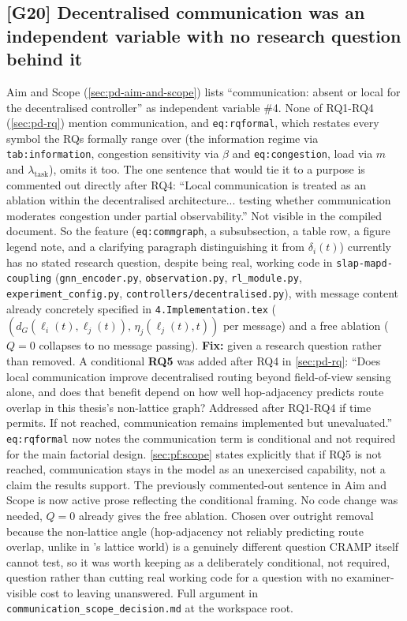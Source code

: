 \documentclass[11pt]{article}
\begin{document}
\subsection{[G20] Decentralised communication was an independent
variable with no research question behind it}
Aim and Scope (\ref{sec:pd-aim-and-scope}) lists ``communication: absent or
local for the decentralised controller'' as independent variable \#4. None
of RQ1-RQ4 (\ref{sec:pd-rq}) mention communication, and \texttt{eq:rqformal},
which restates every symbol the RQs formally range over (the information
regime via \texttt{tab:information}, congestion sensitivity via $\beta$ and
\texttt{eq:congestion}, load via $m$ and $\lambda_{\mathrm{task}}$), omits
it too. The one sentence that would tie it to a purpose is commented out
directly after RQ4: ``Local communication is treated as an ablation within
the decentralised architecture... testing whether communication moderates
congestion under partial observability.'' Not visible in the compiled
document. So the feature (\texttt{eq:commgraph}, a subsubsection, a table
row, a figure legend note, and a clarifying paragraph distinguishing it
from $\delta_i(t)$) currently has no stated research question, despite
being real, working code in \texttt{slap-mapd-coupling}
(\texttt{gnn\_encoder.py}, \texttt{observation.py}, \texttt{rl\_module.py},
\texttt{experiment\_config.py}, \texttt{controllers/decentralised.py}), with
message content already concretely specified in
\texttt{4.Implementation.tex} ($(d_G(\ell_i(t),\ell_j(t)),\,
\eta_j(\ell_j(t),t))$ per message) and a free ablation ($Q=0$ collapses to
no message passing). \textbf{Fix:} given a research question rather than
removed. A conditional \textbf{RQ5} was added after RQ4 in
\ref{sec:pd-rq}: ``Does local communication improve decentralised routing
beyond field-of-view sensing alone, and does that benefit depend on how
well hop-adjacency predicts route overlap in this thesis's non-lattice
graph? Addressed after RQ1-RQ4 if time permits. If not reached,
communication remains implemented but unevaluated.'' \texttt{eq:rqformal}
now notes the communication term is conditional and not required for the
main factorial design. \ref{sec:pf:scope} states explicitly that if RQ5 is
not reached, communication stays in the model as an unexercised capability,
not a claim the results support. The previously commented-out sentence in
Aim and Scope is now active prose reflecting the conditional framing. No
code change was needed, $Q=0$ already gives the free ablation. Chosen over
outright removal because the non-lattice angle (hop-adjacency not
reliably predicting route overlap, unlike in
\citet{pham2024optimizingcrowdawaremultiagentpath}'s lattice world) is a
genuinely different question CRAMP itself cannot test, so it was worth
keeping as a deliberately conditional, not required, question rather than
cutting real working code for a question with no examiner-visible cost to
leaving unanswered. Full argument in
\texttt{communication\_scope\_decision.md} at the workspace root.
\end{document}

